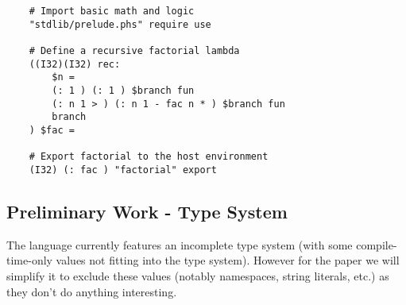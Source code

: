 \documentclass{article}
\begin{document}
    \begin{verbatim}
    # Import basic math and logic
    "stdlib/prelude.phs" require use

    # Define a recursive factorial lambda
    ((I32)(I32) rec:
        $n =
        (: 1 ) (: 1 ) $branch fun
        (: n 1 > ) (: n 1 - fac n * ) $branch fun
        branch
    ) $fac =
    
    # Export factorial to the host environment
    (I32) (: fac ) "factorial" export
    \end{verbatim}
    
    
\subsection{Preliminary Work - Type System}
The language currently features an incomplete type system (with some compile-time-only values not fitting into the type system). However for the paper we will simplify it to exclude these values (notably namespaces, string literals, etc.) as they don't do anything interesting.
\end{document}
